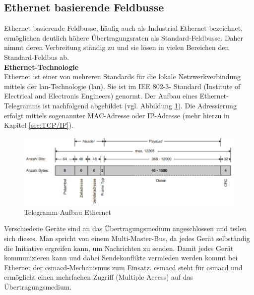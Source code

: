 \documentclass[ a4paper,
                oneside,
                toc=bibliography,
                toc=listof
                ]{scrbook}
\begin{document}
	\subsection{Ethernet basierende Feldbusse}
	\label{subsec:EthernetFeldbus}
	Ethernet basierende Feldbusse, häufig auch als \glqq Industrial Ethernet\grqq{} bezeichnet, ermöglichen deutlich höhere Übertragungsraten als Standard-Feldbusse. Daher nimmt deren Verbreitung ständig zu und sie lösen in vielen Bereichen den Standard-Feldbus ab. \cite{hering2012elektrotechnik}\\
	\textbf{Ethernet-Technologie}\\
	Ethernet ist einer von mehreren Standards für die lokale Netzwerkverbindung mittels der \acs{lan}-Technologie (\acl{lan}). Sie ist im IEE 802-3- Standard (Institute of Electrical and Electronis Engineers) genormt. Der Aufbau eines Ethernet-Telegramms ist nachfolgend abgebildet (vgl. Abbildung \ref{fig:EthernetTelegramm}). Die Adressierung erfolgt mittels sogenannter MAC-Adresse oder IP-Adresse (mehr hierzu in Kapitel \ref{sec:TCP/IP}). \cite{riggert2002rechnernetze}\\
	\begin{figure}[!ht]
		\centering
		\includegraphics[width=1.0\linewidth]{./images/Ethernet-Telegram.png}
		\caption{Telegramm-Aufbau Ethernet \cite{hering2012elektrotechnik}}
		\label{fig:EthernetTelegramm}
	\end{figure}
	Verschiedene Geräte sind an das Übertragungsmedium angeschlossen und teilen sich dieses. Man spricht von einem Multi-Master-Bus, da jedes Gerät selbständig die Initiative ergreifen kann, um Nachrichten zu senden. Damit jedes Gerät kommunizieren kann und dabei Sendekonflikte vermieden werden kommt bei Ethernet der \acs{csmacd}-Mechanismus zum Einsatz. \acs{csmacd} steht für \glqq \acl{csmacd}\grqq{} und ermöglicht einen mehrfachen Zugriff (Multiple Access) auf das Übertragungsmedium. \cite{hering2012elektrotechnik} \cite{riggert2002rechnernetze}
\end{document}
